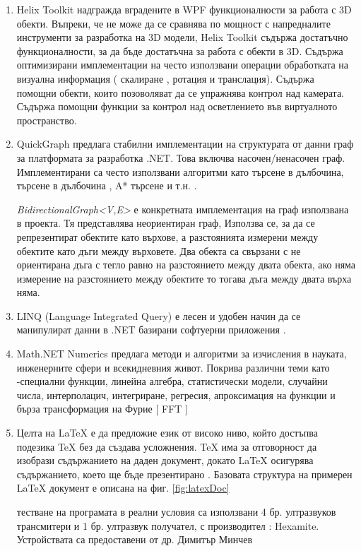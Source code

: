 \begin{enumerate}
    \item Helix Toolkit надгражда вградените в WPF функционалности за работа с 3D обекти. Въпреки, че не може да се сравнява по мощност с напредналите инструменти за разработка на 3D модели, Helix Toolkit съдържа достатъчно функционалности, за да бъде достатъчна за работа с обекти в 3D. Съдържа оптимизирани имплементации на често използвани операции обработката на визуална информация ( скалиране , ротация и транслация). Съдържа помощни обекти, които позоволяват да се упражнява контрол над камерата. Съдържа помощни функции за контрол над осветлението във виртуалното пространство. \cite{helix}
    
    \item QuickGraph предлага стабилни имплементации на структурата от данни граф за платформата за разработка .NET. Това включва насочен/ненасочен граф. Имплементирани са често използвани алгоритми като търсене в дълбочина, търсене в дълбочина , A* търсене и т.н. \cite{quickgraph}.
    
    \textit{BidirectionalGraph<V,E>} е конкретната имплементация на граф използвана в проекта.  Тя представлява неориентиран граф, Използва се, за да се репрезентират обектите като върхове, а разстоянията измерени между обектите като дъги между върховете. Два обекта са свързани с не ориентирана дъга с тегло равно на разстоянието между двата обекта, ако няма измерение на разстоянието между обектите то тогава дъга между двата върха няма.
    
    \item LINQ (Language Integrated Query) е лесен и удобен начин да се манипулират данни в .NET базирани софтуерни приложения \cite{linq}. 
    
    \item Math.NET Numerics предлага методи и алгоритми за изчисления в науката, инженерните сфери и всекидневния живот. Покрива различни теми като -специални функции, линейна алгебра, статистически модели, случайни числа, интерполацич, интегриране, регресия, апроксимация на функции и бърза трансформация на Фурие [ FFT ] \cite{numerics}
    
    \item Целта на LaTeX е да предложие език от високо ниво, който достъпва подезика TeX без да създава усложнения. TeX има за отговорност да изобрази съдържанието на даден документ, докато LaTeX осигурява съдържанието, което ще бъде презентирано \cite{latexWiki}. Базовата структура на примерен LaTeX документ е описана на фиг. \ref{fig:latexDoc}
    
     тестване на програмата в реални условия са използвани 4 бр. ултразвуков трансмитери и 1 бр. ултразвук получател, с производител : Hexamite. Устройствата са предоставени от др. Димитър Минчев

    
\end{enumerate}


